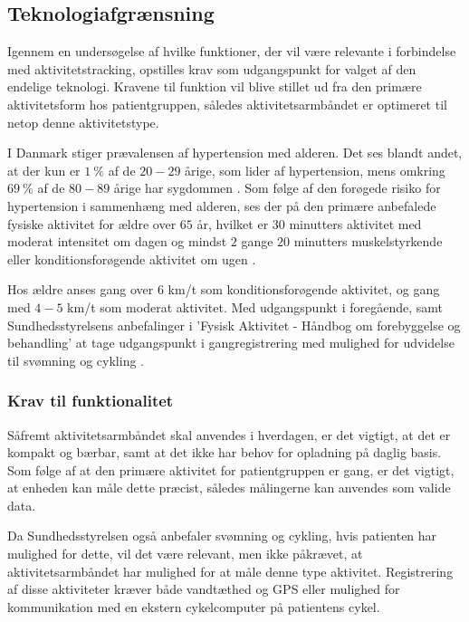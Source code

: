 \subsection{Teknologiafgrænsning}

Igennem en undersøgelse af hvilke funktioner, der vil være relevante i forbindelse med aktivitetstracking, opstilles krav som udgangspunkt for valget af den endelige teknologi. Kravene til funktion vil blive stillet ud fra den primære aktivitetsform hos patientgruppen, således aktivitetsarmbåndet er optimeret til netop denne aktivitetstype.

I Danmark stiger prævalensen af hypertension med alderen. Det ses blandt andet, at der kun er $1~\%$ af de $20-29$ årige, som lider af hypertension, mens omkring $69~\%$ af de $80-89$ årige har sygdommen \citep{olsen2015}. Som følge af den forøgede risiko for hypertension i sammenhæng med alderen, ses der på den primære anbefalede fysiske aktivitet for ældre over $65$ år, hvilket er $30$ minutters aktivitet med moderat intensitet om dagen og mindst $2$ gange $20$ minutters muskelstyrkende eller konditionsforøgende aktivitet om ugen \citep{pedersen2011}.

Hos ældre anses gang over $6$ km/t som konditionsforøgende aktivitet, og gang med $4-5$ km/t som moderat aktivitet. Med udgangspunkt i foregående, samt Sundhedsstyrelsens anbefalinger i 'Fysisk Aktivitet - Håndbog om forebyggelse og behandling' at tage udgangspunkt i gangregistrering med mulighed for udvidelse til svømning og cykling \citep{pedersen2011}.

\subsubsection{Krav til funktionalitet}

Såfremt aktivitetsarmbåndet skal anvendes i hverdagen, er det vigtigt, at det er kompakt og bærbar, samt at det ikke har behov for opladning på daglig basis. Som følge af at den primære aktivitet for patientgruppen er gang, er det vigtigt, at enheden kan måle dette præcist, således målingerne kan anvendes som valide data. 

Da Sundhedsstyrelsen også anbefaler svømning og cykling, hvis patienten har mulighed for dette, vil det være relevant, men ikke påkrævet, at aktivitetsarmbåndet har mulighed for at måle denne type aktivitet. Registrering af disse aktiviteter kræver både vandtæthed og GPS eller mulighed for kommunikation med en ekstern cykelcomputer på patientens cykel.

